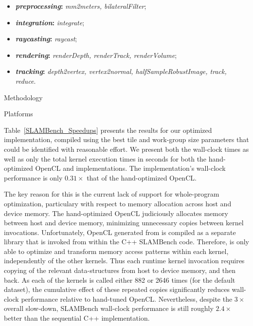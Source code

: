 \documentclass{llncs}
\begin{document}
\begin{itemize}
\item \textbf{\textit{preprocessing}:} \textit{mm2meters, bilateralFilter};
\item \textbf{\textit{integration}:} \textit{integrate};
\item \textbf{\textit{raycasting}:} \textit{raycast};
\item \textbf{\textit{rendering}:} \textit{renderDepth, renderTrack, renderVolume};
\item \textbf{\textit{tracking}:} \textit{depth2vertex, vertex2normal,
      halfSampleRobustImage, track, reduce}.
\end{itemize}


Methodology


Platforms


Table~\ref{SLAMBench_Speedups} presents the results for our optimized
\pencil implementation, compiled using the best \PPCG tile and
work-group size parameters that could be identified with reasonable
effort.
We present both the wall-clock times as well as only the total kernel
execution times in seconds for both the hand-optimized OpenCL and
\pencil implementations.
The \pencil implementation's wall-clock performance is only
$0.31\times$ that of the hand-optimized OpenCL.

The key reason for this is the current lack of support for whole-program
optimization, particulary with respect to memory allocation across host
and device memory.
The hand-optimized OpenCL judiciously allocates memory between host and
device memory, minimizing unnecessary copies between kernel invocations.
Unfortunately, OpenCL generated from \pencil is compiled as a separate
library that is invoked from within the C++ SLAMBench code.
Therefore, \PPCG is only able to optimize and transform memory access
patterns within each kernel, independently of the other kernels. 
Thus each runtime kernel invocation requires copying of the relevant
data-structures from host to device memory, and then back. 
As each of the kernels is called either 882 or 2646 times (for the
default dataset), the cumulative effect of these repeated copies
significantly reduces wall-clock performance relative to hand-tuned OpenCL.
Nevertheless, despite the $3\times$ overall slow-down, \pencil SLAMBench
wall-clock performance is still roughly $2.4\times$ better than the
sequential C++ implementation.
\end{document}
